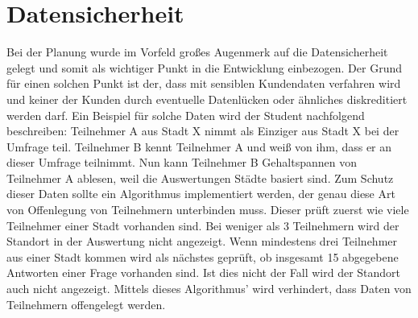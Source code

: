 \section{Datensicherheit}
Bei der Planung wurde im Vorfeld großes Augenmerk auf die Datensicherheit gelegt und somit als wichtiger Punkt in die Entwicklung einbezogen. Der Grund für einen solchen Punkt ist der, dass mit sensiblen Kundendaten verfahren wird und keiner der Kunden durch eventuelle Datenlücken oder ähnliches diskreditiert werden darf.
Ein Beispiel für solche Daten wird der Student nachfolgend beschreiben: 
Teilnehmer A aus Stadt X nimmt als Einziger aus Stadt X bei der Umfrage teil. Teilnehmer B kennt Teilnehmer A und weiß von ihm, dass er an dieser Umfrage teilnimmt. Nun kann Teilnehmer B Gehaltspannen von Teilnehmer A ablesen, weil die Auswertungen St\"adte basiert sind. Zum Schutz dieser Daten sollte ein Algorithmus implementiert werden, der genau diese Art von Offenlegung von Teilnehmern unterbinden muss. Dieser pr\"uft zuerst wie viele Teilnehmer einer Stadt vorhanden sind. Bei weniger als 3 Teilnehmern wird der Standort in der Auswertung nicht angezeigt. Wenn mindestens drei Teilnehmer aus einer Stadt kommen wird als n\"achstes gepr\"uft, ob insgesamt 15 abgegebene Antworten einer Frage vorhanden sind. Ist dies nicht der Fall wird der Standort auch nicht angezeigt. Mittels dieses Algorithmus' wird verhindert, dass Daten von Teilnehmern offengelegt werden.